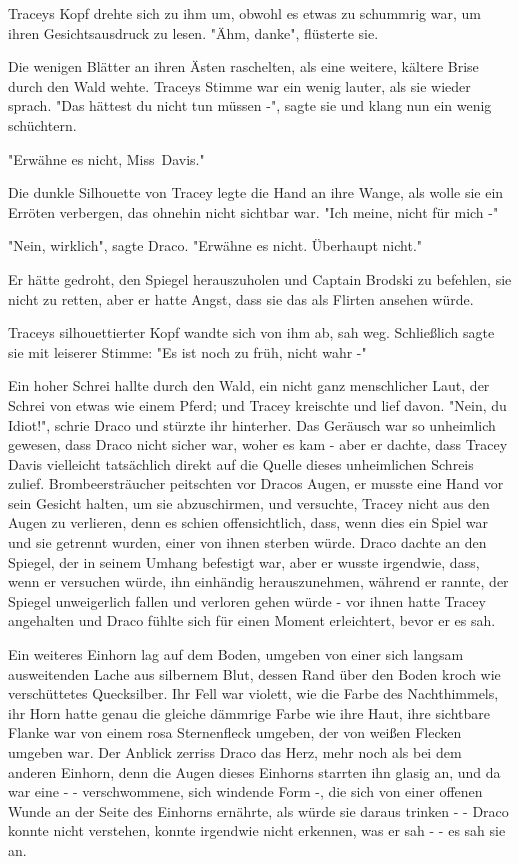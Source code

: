 {Traceys Kopf drehte sich zu ihm um, obwohl es etwas zu schummrig war, um ihren Gesichtsausdruck zu lesen. "Ähm, danke", flüsterte sie.

Die wenigen Blätter an ihren Ästen raschelten, als eine weitere, kältere Brise durch den Wald wehte. Traceys Stimme war ein wenig lauter, als sie wieder sprach. "Das hättest du nicht tun müssen -", sagte sie und klang nun ein wenig schüchtern.

"Erwähne es nicht, Miss~Davis."

Die dunkle Silhouette von Tracey legte die Hand an ihre Wange, als wolle sie ein Erröten verbergen, das ohnehin nicht sichtbar war. "Ich meine, nicht für mich -"

"Nein, wirklich", sagte Draco. "Erwähne es nicht. Überhaupt nicht."

Er hätte gedroht, den Spiegel herauszuholen und Captain Brodski zu befehlen, sie nicht zu retten, aber er hatte Angst, dass sie das als Flirten ansehen würde.

Traceys silhouettierter Kopf wandte sich von ihm ab, sah weg. Schließlich sagte sie mit leiserer Stimme: "Es ist noch zu früh, nicht wahr -"

Ein hoher Schrei hallte durch den Wald, ein nicht ganz menschlicher Laut, der Schrei von etwas wie einem Pferd; und Tracey kreischte und lief davon. "Nein, du Idiot!", schrie Draco und stürzte ihr hinterher. Das Geräusch war so unheimlich gewesen, dass Draco nicht sicher war, woher es kam - aber er dachte, dass Tracey Davis vielleicht tatsächlich direkt auf die Quelle dieses unheimlichen Schreis zulief. Brombeersträucher peitschten vor Dracos Augen, er musste eine Hand vor sein Gesicht halten, um sie abzuschirmen, und versuchte, Tracey nicht aus den Augen zu verlieren, denn es schien offensichtlich, dass, wenn dies ein Spiel war und sie getrennt wurden, einer von ihnen sterben würde. Draco dachte an den Spiegel, der in seinem Umhang befestigt war, aber er wusste irgendwie, dass, wenn er versuchen würde, ihn einhändig herauszunehmen, während er rannte, der Spiegel unweigerlich fallen und verloren gehen würde - vor ihnen hatte Tracey angehalten und Draco fühlte sich für einen Moment erleichtert, bevor er es sah.

Ein weiteres Einhorn lag auf dem Boden, umgeben von einer sich langsam ausweitenden Lache aus silbernem Blut, dessen Rand über den Boden kroch wie verschüttetes Quecksilber. Ihr Fell war violett, wie die Farbe des Nachthimmels, ihr Horn hatte genau die gleiche dämmrige Farbe wie ihre Haut, ihre sichtbare Flanke war von einem rosa Sternenfleck umgeben, der von weißen Flecken umgeben war. Der Anblick zerriss Draco das Herz, mehr noch als bei dem anderen Einhorn, denn die Augen dieses Einhorns starrten ihn glasig an, und da war eine - - verschwommene, sich windende Form -, die sich von einer offenen Wunde an der Seite des Einhorns ernährte, als würde sie daraus trinken - - Draco konnte nicht verstehen, konnte irgendwie nicht erkennen, was er sah - - es sah sie an.

}
